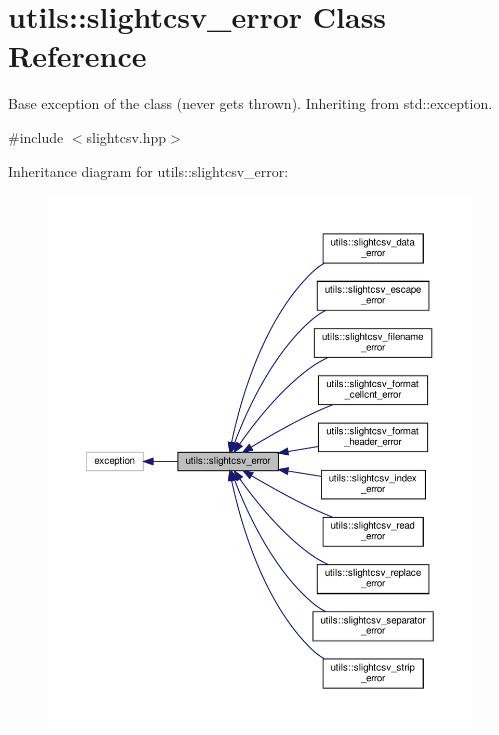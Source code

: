 \hypertarget{classutils_1_1slightcsv__error}{}\section{utils\+:\+:slightcsv\+\_\+error Class Reference}
\label{classutils_1_1slightcsv__error}


Base exception of the class (never gets thrown). Inheriting from std\+::exception.  




{\ttfamily \#include $<$slightcsv.\+hpp$>$}



Inheritance diagram for utils\+:\+:slightcsv\+\_\+error\+:
\nopagebreak
\begin{figure}[H]
\begin{center}
\leavevmode
\includegraphics[width=350pt]{classutils_1_1slightcsv__error__inherit__graph}
\end{center}
\end{figure}


